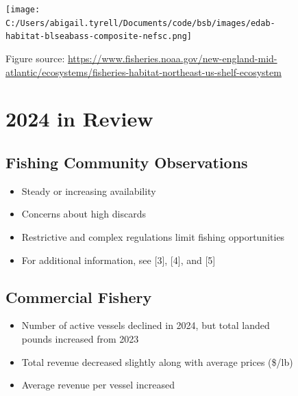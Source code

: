 \documentclass[
  10pt,
  letterpaper,
  DIV=11,
  numbers=noendperiod]{scrartcl}
\providecommand{\tightlist}{%
  \setlength{\itemsep}{0pt}\setlength{\parskip}{0pt}}\usepackage{longtable,booktabs,array}
\begin{document}
\begin{figure}

\begin{minipage}{0.40\linewidth}

\texttt{[image: C:/Users/abigail.tyrell/Documents/code/bsb/images/edab-habitat-blseabass-composite-nefsc.png]}
\footnotesize

\raggedright

Figure source:
\url{https://www.fisheries.noaa.gov/new-england-mid-atlantic/ecosystems/fisheries-habitat-northeast-us-shelf-ecosystem}
\normalsize\end{minipage}%
%
\begin{minipage}{0.03\linewidth}

\hfill

\end{minipage}%
%
\begin{minipage}{0.57\linewidth}

\section{2024 in Review}
\vspace{-0.25cm}

\subsection{Fishing Community Observations}

\begin{itemize}
\tightlist
\item
  Steady or increasing availability
\item
  Concerns about high discards
\item
  Restrictive and complex regulations limit fishing opportunities
\item
  For additional information, see {[}3{]}, {[}4{]}, and {[}5{]}
\end{itemize}

\vspace{-0.25cm}
\subsection{Commercial Fishery}

\begin{itemize}
\tightlist
\item
  Number of active vessels declined in 2024, but total landed pounds
  increased from 2023
\item
  Total revenue decreased slightly along with average prices (\$/lb)
\item
  Average revenue per vessel increased
\end{itemize}


\end{minipage}
\end{figure}
\end{document}
